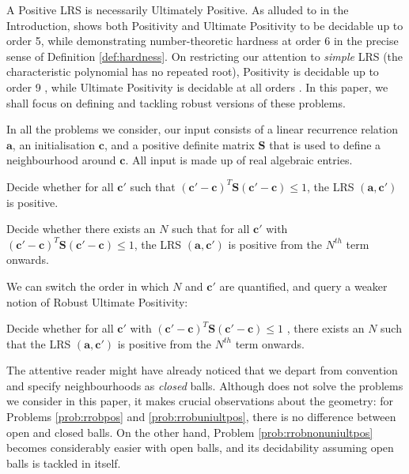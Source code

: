 A Positive LRS is necessarily Ultimately Positive. As alluded to in the Introduction, \cite{joeljames3} shows both Positivity and Ultimate Positivity to be decidable up to order 5, while demonstrating number-theoretic hardness at order 6 in the precise sense of Definition \ref{def:hardness}. On restricting our attention to \textit{simple} LRS (the characteristic polynomial has no repeated root), Positivity is decidable up to order 9 \cite{ouaknine2014positivity}, while Ultimate Positivity is decidable at all orders \cite{ouaknine2014ultimate}. In this paper, we shall focus on defining and tackling robust versions of these problems.

In all the problems we consider, our input consists of a linear recurrence relation $\mathbf{a}$, an initialisation $\mathbf{c}$, and a positive definite matrix $\mathbf{S}$ that is used to define a neighbourhood around $\mathbf{c}$. All input is made up of real algebraic entries.

\begin{problem}
\label{prob:rrobpos}
Decide whether for all $\mathbf{c'}$ such that $(\mathbf{c'} - \mathbf{c})^T\mathbf{S}(\mathbf{c'} - \mathbf{c}) \le 1$, the LRS $(\mathbf{a}, \mathbf{c'})$ is positive.
\end{problem}

\begin{problem}
\label{prob:rrobuniultpos}
Decide whether there exists an $N$ such that for all $\mathbf{c'}$ with $(\mathbf{c'} - \mathbf{c})^T\mathbf{S}(\mathbf{c'} - \mathbf{c}) \le 1$, the LRS $(\mathbf{a}, \mathbf{c'})$ is positive from the $N^{th}$ term onwards.
\end{problem}

We can switch the order in which $N$ and $\mathbf{c'}$ are quantified, and query a weaker notion of Robust Ultimate Positivity:
\begin{problem}
\label{prob:rrobnonuniultpos}
Decide whether for all $\mathbf{c'}$ with $(\mathbf{c'} - \mathbf{c})^T\mathbf{S}(\mathbf{c'} - \mathbf{c}) \le 1$ , there exists an $N$ such that the LRS $(\mathbf{a}, \mathbf{c'})$ is positive from the $N^{th}$ term onwards.
\end{problem}

The attentive reader might have already noticed that we depart from convention and specify neighbourhoods as \textit{closed} balls. Although \cite{originalarxiv} does not solve the problems we consider in this paper, it makes crucial observations about the geometry: for Problems \ref{prob:rrobpos} and \ref{prob:rrobuniultpos}, there is no difference between open and closed balls. On the other hand, Problem \ref{prob:rrobnonuniultpos} becomes considerably easier with open balls, and its decidability assuming open balls is tackled in \cite{originalarxiv} itself. 

